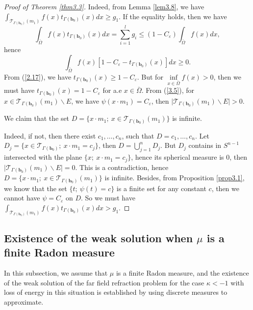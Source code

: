 \documentclass[a4paper,12pt,]{article}
\numberwithin{equation}{section}
\numberwithin{equation}{section} \allowdisplaybreaks
\begin{document}
\begin{proof}[Proof of Theorem \ref{thm3.3}]
  Indeed, from Lemma \ref{lem3.8}, we have $\displaystyle\int_{\mathcal{T}_{\Gamma(\mathbf{b}_{0})}(m_{1})}f(x)t_{\Gamma(\mathbf{b}_{0})}(x)dx \geq g_{1}$. If the equality holds, then we have
  $$\int_{\bar{\Omega}}f(x)t_{\Gamma(\mathbf{b}_{0})}(x)dx = \sum_{i = 1}^{l}g_{i} \leq (1 - C_{\varepsilon})\int_{\bar{\Omega}}f(x)dx,$$
  hence 
  $$\int_{\bar{\Omega}}f(x)[1 - C_{\varepsilon} - t_{\Gamma(\mathbf{b}_{0})}(x)]dx \geq 0.$$
  From (\ref{2.17}), we have $t_{\Gamma(\mathbf{b}_{0})}(x) \geq 1 - C_{\varepsilon}$. But for $\inf\limits_{x \in \bar{\Omega}}f(x)>0$, then we must have $t_{\Gamma(\mathbf{b}_{0})}(x) = 1 - C_{\varepsilon}$ for a.e $x \in \bar{\Omega}$. From (\ref{3.5}), for $x \in \mathcal{T}_{\Gamma(\mathbf{b}_{0})}(m_{1}) \backslash E$, we have $\psi(x \cdot m_{1}) = C_{\varepsilon}$, then $\vert \mathcal{T}_{\Gamma(\mathbf{b}_{0})}(m_{1}) \backslash E \vert > 0$.
  
  We claim that the set $D = \{x \cdot m_{1};~x \in \mathcal{T}_{\Gamma(\mathbf{b}_{0})}(m_{1})\}$ is infinite.
  
  Indeed, if not, then there exist $c_{1}, \ldots, c_{n}$, such that $D = {c_{1}, \ldots, c_{n}}$. Let $D_{j} = \{x \in \mathcal{T}_{\Gamma(\mathbf{b}_{0})};~x\cdot m_{1} = c_{j}\}$, then $D = \bigcup\limits_{j=1}^{n} D_{j}$. But $D_{j}$ contains in $S^{n-1}$ intersected with the plane $\{x;~x\cdot m_{1} = c_{j}\}$, hence its spherical measure is 0, then $\vert \mathcal{T}_{\Gamma(\mathbf{b}_{0})}(m_{1}) \backslash E \vert = 0$. This is a contradiction, hence $D = \{x \cdot m_{1};~x \in \mathcal{T}_{\Gamma(\mathbf{b}_{0})}(m_{1})\}$ is infinite. Besides, from Proposition \ref{prop3.1}, we know that the set $\{t;~\psi(t) = c\}$ is a finite set for any constant $c$, then we cannot have $\psi = C_{\varepsilon}$ on $D$. So we must have $\displaystyle\int_{\mathcal{T}_{\Gamma(\mathbf{b}_{0})}(m_{1})}f(x)t_{\Gamma(\mathbf{b}_{0})}(x)dx > g_{1}$.
\end{proof}


\subsection{Existence of the weak solution when $\mu$ is a finite Radon measure}

In this subsection, we assume that $\mu$ is a finite Radon measure, and the existence of the weak solution of the far field refraction problem for the case $\kappa <-1$ with loss of energy in this situation is established by using discrete measures to approximate.
\end{document}
